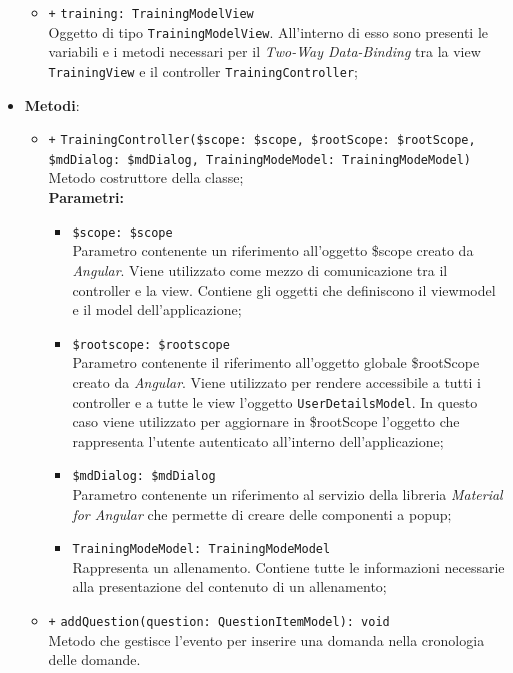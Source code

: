 \begin{itemize}
\begin{itemize}
		\item \texttt{+} \texttt{training: TrainingModelView} \\
		Oggetto di tipo \texttt{TrainingModelView}. All'interno di esso sono presenti le variabili e i metodi necessari per il \textit{Two-Way Data-Binding} tra la view \texttt{TrainingView} e il controller \texttt{TrainingController};
	\end{itemize}
	\item \textbf{Metodi}:
	\begin{itemize}
		\item \texttt{+} \texttt{TrainingController(\$scope: \$scope, \$rootScope: \$rootScope, \$mdDialog: \$mdDialog, TrainingModeModel: TrainingModeModel)} \\ Metodo costruttore della classe; \\
		\textbf{Parametri:}
		\begin{itemize}
			\item \texttt{\$scope: \$scope} \\
			Parametro contenente un riferimento all’oggetto \$scope creato da \textit{Angular}. Viene utilizzato come mezzo di comunicazione tra il controller e la view. Contiene gli oggetti che definiscono il viewmodel e il model dell’applicazione;
			\item \texttt{\$rootscope: \$rootscope}\\
			Parametro contenente il riferimento all'oggetto globale \$rootScope creato da \textit{Angular}. Viene utilizzato per rendere accessibile a tutti i controller e a tutte le view l'oggetto \texttt{UserDetailsModel}. In questo caso viene utilizzato per aggiornare in \$rootScope l'oggetto che rappresenta l'utente autenticato all'interno dell'applicazione;
			\item \texttt{\$mdDialog: \$mdDialog} \\
			Parametro contenente un riferimento al servizio della libreria \textit{Material for Angular} che permette di creare delle componenti a popup;
			\item \texttt{TrainingModeModel: TrainingModeModel} \\ Rappresenta un allenamento. Contiene tutte le informazioni necessarie alla presentazione del contenuto di un allenamento;
		\end{itemize}
		\item \texttt{+} \texttt{addQuestion(question: QuestionItemModel): void} \\
		Metodo che gestisce l'evento per inserire una domanda nella cronologia delle domande. \\

\end{itemize}
\end{itemize}

